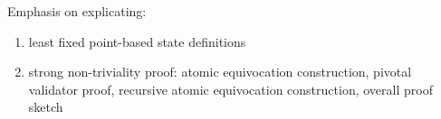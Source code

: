 Emphasis on explicating: 
\begin{enumerate}
	\item least fixed point-based state definitions
	\item strong non-triviality proof: atomic equivocation construction, pivotal validator proof, recursive atomic equivocation construction, overall proof sketch
\end{enumerate}
